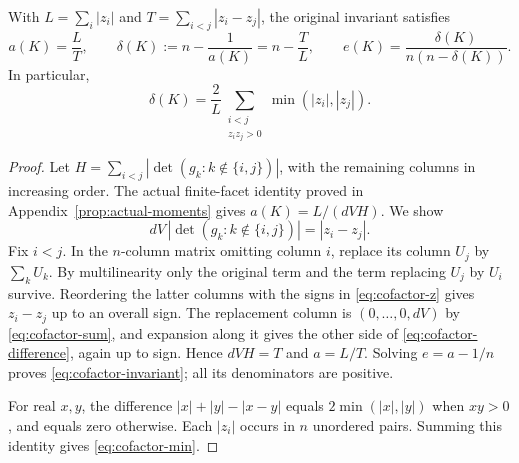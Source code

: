 \begin{theorem}\label{thm:cofactor}
With $L=\sum_i|z_i|$ and $T=\sum_{i<j}|z_i-z_j|$, the original invariant
satisfies
\begin{equation}\label{eq:cofactor-invariant}
 a(K)=\frac LT,\qquad
 \delta(K):=n-\frac1{a(K)}=n-\frac TL,\qquad
 e(K)=\frac{\delta(K)}{n(n-\delta(K))}.
\end{equation}
In particular,
\begin{equation}\label{eq:cofactor-min}
 \delta(K)=\frac2L\sum_{\substack{i<j\\z_iz_j>0}}
                            \min(|z_i|,|z_j|).
\end{equation}
\end{theorem}
\begin{proof}
Let $H=\sum_{i<j}|\det(g_k:k\notin\{i,j\})|$, with the remaining
columns in increasing order. The actual finite-facet identity proved
in Appendix~\ref{prop:actual-moments} gives $a(K)=L/(dVH)$. We show
\begin{equation}\label{eq:cofactor-difference}
 dV\,|\det(g_k:k\notin\{i,j\})|=|z_i-z_j|.
\end{equation}
Fix $i<j$. In the $n$-column matrix omitting column $i$, replace its
column $U_j$ by $\sum_kU_k$. By multilinearity only the original term
and the term replacing $U_j$ by $U_i$ survive. Reordering the latter
columns with the signs in \eqref{eq:cofactor-z} gives $z_i-z_j$ up to an
overall sign. The replacement column is $(0,\ldots,0,dV)$ by
\eqref{eq:cofactor-sum}, and expansion along it gives the other side of
\eqref{eq:cofactor-difference}, again up to sign. Hence $dVH=T$ and
$a=L/T$. Solving $e=a-1/n$ proves \eqref{eq:cofactor-invariant}; all
its denominators are positive.

For real $x,y$, the difference $|x|+|y|-|x-y|$ equals
$2\min(|x|,|y|)$ when $xy>0$, and equals zero otherwise. Each $|z_i|$
occurs in $n$ unordered pairs. Summing this identity gives
\eqref{eq:cofactor-min}.
\end{proof}

